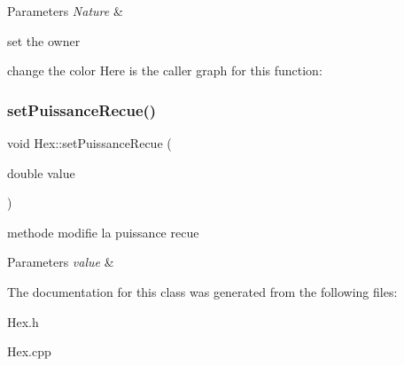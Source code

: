 \begin{DoxyParams}{Parameters}
{\em Nature} & \\
\hline
\end{DoxyParams}
set the owner

change the color Here is the caller graph for this function\+:
\mbox{\label{class_hex_a4c4119527eca8566ffb9093fa8f56e28}} 
\subsubsection{\texorpdfstring{setPuissanceRecue()}{setPuissanceRecue()}}
{\footnotesize\ttfamily void Hex\+::set\+Puissance\+Recue (\begin{DoxyParamCaption}\item[{double}]{value }\end{DoxyParamCaption})}



methode modifie la puissance recue 


\begin{DoxyParams}{Parameters}
{\em value} & \\
\hline
\end{DoxyParams}


The documentation for this class was generated from the following files\+:\begin{DoxyCompactItemize}
\item 
Hex.\+h\item 
Hex.\+cpp\end{DoxyCompactItemize}
